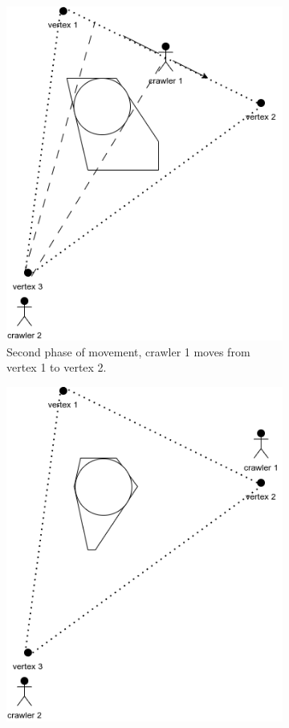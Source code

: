\begin{figure}[h!]
\begin{subfigure}[t]{0.27\linewidth}
		\includegraphics[width=\linewidth]{graphics/triangle_4.png}
		\caption{Second phase of movement, crawler 1 moves from vertex 1 to vertex 2.}
		\label{fig:triangle_4}
	\end{subfigure}
	\hfill
	\begin{subfigure}[t]{0.27\linewidth}
		\centering
		\includegraphics[width=\linewidth]{graphics/triangle_5.png}

\end{subfigure}
\end{figure}
